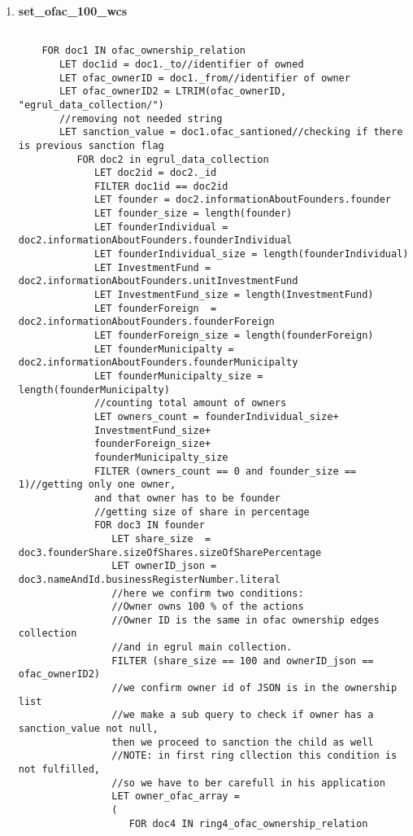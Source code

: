 \begin{enumerate}
	
	\item \textbf{set\_ofac\_100\_wcs}\label{query11}
	\begin{verbatim}
	
	FOR doc1 IN ofac_ownership_relation
	   LET doc1id = doc1._to//identifier of owned
	   LET ofac_ownerID = doc1._from//identifier of owner
	   LET ofac_ownerID2 = LTRIM(ofac_ownerID, "egrul_data_collection/") 
	   //removing not needed string
	   LET sanction_value = doc1.ofac_santioned//checking if there is previous sanction flag
	      FOR doc2 in egrul_data_collection
	         LET doc2id = doc2._id
	         FILTER doc1id == doc2id
	         LET founder = doc2.informationAboutFounders.founder
 	         LET founder_size = length(founder)
	         LET founderIndividual = doc2.informationAboutFounders.founderIndividual
	         LET founderIndividual_size = length(founderIndividual)
	         LET InvestmentFund = doc2.informationAboutFounders.unitInvestmentFund
	         LET InvestmentFund_size = length(InvestmentFund)
	         LET founderForeign  = doc2.informationAboutFounders.founderForeign
	         LET founderForeign_size = length(founderForeign)
	         LET founderMunicipalty = doc2.informationAboutFounders.founderMunicipalty
	         LET founderMunicipalty_size = length(founderMunicipalty)
	         //counting total amount of owners
	         LET owners_count = founderIndividual_size+
	         InvestmentFund_size+
	         founderForeign_size+
	         founderMunicipalty_size
	         FILTER (owners_count == 0 and founder_size == 1)//getting only one owner, 
	         and that owner has to be founder
	         //getting size of share in percentage
	         FOR doc3 IN founder
	            LET share_size  = doc3.founderShare.sizeOfShares.sizeOfSharePercentage
	            LET ownerID_json = doc3.nameAndId.businessRegisterNumber.literal
	            //here we confirm two conditions:
	            //Owner owns 100 % of the actions
	            //Owner ID is the same in ofac ownership edges collection 
	            //and in egrul main collection. 
	            FILTER (share_size == 100 and ownerID_json == ofac_ownerID2)
	            //we confirm owner id of JSON is in the ownership list
	            //we make a sub query to check if owner has a sanction_value not null, 
	            then we proceed to sanction the child as well
	            //NOTE: in first ring cllection this condition is not fulfilled, 
	            //so we have to ber carefull in his application
	            LET owner_ofac_array = 
	            (
	               FOR doc4 IN ring4_ofac_ownership_relation

\end{verbatim}
\end{enumerate}

